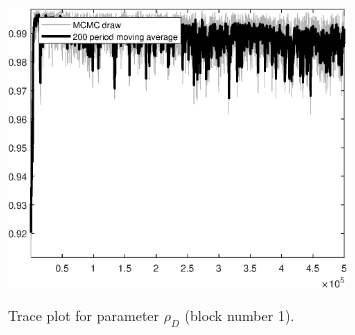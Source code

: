 \begin{figure}[H]
\centering
  \includegraphics[width=0.8\textwidth]{BRS_growth_ext_shopping/graphs/TracePlot_rho_D_blck_1}\\
    \caption{Trace plot for parameter ${\rho_D}$ (block number 1).}
\end{figure}
